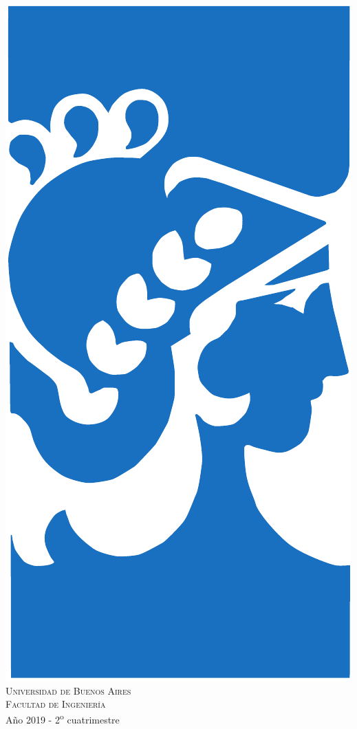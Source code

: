 \documentclass[a4paper, 10pt, spanish]{article}
\begin{document}
\marginsize{2cm}{2cm}{2cm}{2cm}
%
%
\begin{titlepage}

\thispagestyle{empty}

\begin{center}
\includegraphics[scale=0.3]{fiuba.pdf}\\
\large{\textsc{Universidad de Buenos Aires}}\\
\large{\textsc{Facultad de Ingeniería}}\\
\small{Año 2019 - 2\textsuperscript{o} cuatrimestre}
\end{center}


\end{titlepage}
\end{document}
